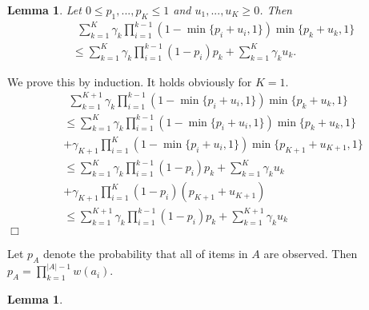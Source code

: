 \documentclass{article}
\newcommand{\abs}[1]{\left| #1 \right|}
\newtheorem{lemma}[theorem]{Lemma}%
\newenvironment{proof}{\noindent {\textbf{Proof. }}}{$\Box$ \medskip}
\begin{document}
	\begin{lemma}
		\label{lem:estimateTech}
		Let $0 \leq p_1,...,p_K \leq 1$ and $u_1,...,u_K \geq 0$. Then
		\begin{align*}
		&~~\sum_{k=1}^K \gamma_k\prod_{i=1}^{k-1}(1-\min\{p_i+u_i, 1\})\min\{p_k+u_k, 1\} \\
		& \leq \sum_{k=1}^K \gamma_k\prod_{i=1}^{k-1}(1-p_i)p_k + \sum_{k=1}^K \gamma_k u_k.
		\end{align*}
	\end{lemma}
	\begin{proof}
		We prove this by induction. It holds obviously for $K=1$.
		\begin{align*}
		&~~\sum_{k=1}^{K+1} \gamma_k\prod_{i=1}^{k-1}(1-\min\{p_i+u_i, 1\})\min\{p_k+u_k, 1\} \\
		&\leq \sum_{k=1}^K \gamma_k\prod_{i=1}^{k-1}(1-\min\{p_i+u_i, 1\})\min\{p_k+u_k, 1\}\\
		&+\gamma_{K+1}\prod_{i=1}^{K}(1-\min\{p_i+u_i, 1\})\min\{p_{K+1}+u_{K+1}, 1\}\\
		&\leq \sum_{k=1}^K \gamma_k\prod_{i=1}^{k-1}(1-p_i)p_k + \sum_{k=1}^K \gamma_k u_k\\
		&+\gamma_{K+1}\prod_{i=1}^{K}(1-p_i)(p_{K+1}+u_{K+1})\\
		&\leq \sum_{k=1}^{K+1} \gamma_k\prod_{i=1}^{k-1}(1-p_i)p_k + \sum_{k=1}^{K+1} \gamma_k u_k
		\end{align*}
	\end{proof}
	
Let $p_A$ denote the probability that all of items in $A$ are observed. Then $p_A = \prod_{k=1}^{\abs{A}-1}w(a_i)$.

\begin{lemma}
	
\end{lemma}
	
\end{document}

